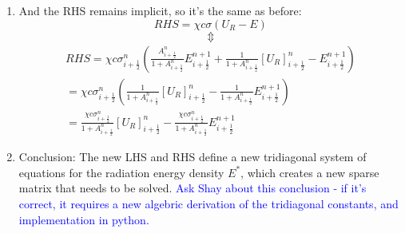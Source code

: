 \documentclass[11pt]{article}
\begin{document}
\begin{enumerate}
  \item And the RHS remains implicit, so it's the same as before:
  \begin{equation}
    RHS = \chi c\sigma(U_R-E)
  \end{equation}
  \begin{equation} \Updownarrow \end{equation}
  \begin{equation}
    \begin{gathered}
  RHS = \chi c \sigma_{i+\frac{1}{2}}^{n} \left(\frac{A_{i+\frac{1}{2}}^n}{1 + A_{i+\frac{1}{2}}^n} E_{i+\frac{1}{2}}^{n+1} + \frac{1}{1 + A_{i+\frac{1}{2}}^n}[U_R]_{i+\frac{1}{2}}^n - E_{i+\frac{1}{2}}^{n+1}\right) \\
  = \chi c \sigma_{i+\frac{1}{2}}^{n}
  \left(\frac{1}{1 + A_{i+\frac{1}{2}}^n}[U_R]_{i+\frac{1}{2}}^n -\frac{1}{1 + A_{i+\frac{1}{2}}^n} E_{i+\frac{1}{2}}^{n+1}\right) \\
  = \frac{\chi c \sigma_{i+\frac{1}{2}}^{n}}{1 + A_{i+\frac{1}{2}}^n}[U_R]_{i+\frac{1}{2}}^n - \frac{\chi c \sigma_{i+\frac{1}{2}}^{n}}{1 + A_{i+\frac{1}{2}}^n} E_{i+\frac{1}{2}}^{n+1} 
  \end{gathered}
  \end{equation}
  \item Conclusion: The new LHS and RHS define a new tridiagonal system of equations for the radiation energy density $E^*$, which creates a new sparse matrix that needs to be solved.
  \textcolor{blue}{Ask Shay about this conclusion - if it's correct, it requires a new algebric derivation of the tridiagonal constants, and implementation in python.}
\end{enumerate}
\end{document}
